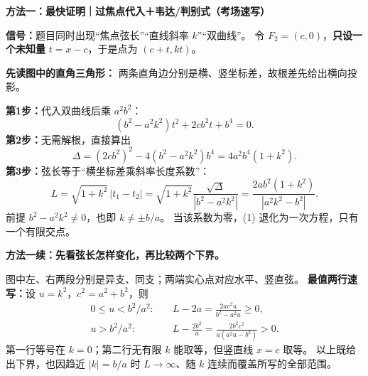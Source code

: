 \clearpage
\begin{proofbox}
\textbf{方法一：最快证明｜过焦点代入＋韦达/判别式（考场速写）}

\textbf{信号：}题目同时出现“焦点弦长”“直线斜率 $k$”“双曲线”。
令 $F_2=(c,0)$，\textbf{只设一个未知量} $t=x-c$，于是点为 $(c+t,kt)$。
\begin{center}\end{center}
\textbf{先读图中的直角三角形：} 两条直角边分别是横、竖坐标差，故根差先给出横向投影。

\textbf{第1步：}代入双曲线后乘 $a^2b^2$：
\[
\boxed{(b^2-a^2k^2)t^2+2cb^2t+b^4=0}.\tag{1}
\]
\textbf{第2步：}无需解根，直接算出
\[
\Delta=(2cb^2)^2-4(b^2-a^2k^2)b^4
=\boxed{4a^2b^4(1+k^2)}.
\]
\textbf{第3步：}弦长等于“横坐标差乘斜率长度系数”：
\[
L=\sqrt{1+k^2}\,|t_1-t_2|
=\sqrt{1+k^2}\frac{\sqrt\Delta}{|b^2-a^2k^2|}
=\boxed{\frac{2ab^2(1+k^2)}{|a^2k^2-b^2|}}.
\]
前提 $b^2-a^2k^2\ne0$，也即 $k\ne\pm b/a$。
当该系数为零，(1) 退化为一次方程，只有一个有限交点。

\tcbbreak
\textbf{方法一续：先看弦长怎样变化，再比较两个下界。}
\begin{center}\end{center}
图中左、右两段分别是异支、同支；两端实心点对应水平、竖直弦。
\textbf{最值两行速写：}设 $u=k^2$，$c^2=a^2+b^2$，则
\[
\boxed{\begin{aligned}
0\le u< b^2/a^2:&\quad L-2a=\frac{2ac^2u}{b^2-a^2u}\ge0,\\[3pt]
u>b^2/a^2:&\quad L-\frac{2b^2}{a}
=\frac{2b^2c^2}{a(a^2u-b^2)}>0.
\end{aligned}}
\]
第一行等号在 $k=0$；第二行无有限 $k$ 能取等，但竖直线 $x=c$ 取等。
以上既给出下界，也因趋近 $|k|=b/a$ 时 $L\to\infty$、随 $k$ 连续而覆盖所写的全部范围。
\end{proofbox}

